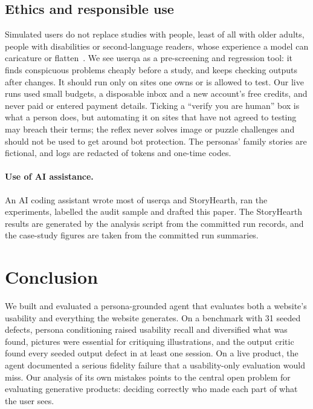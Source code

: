 \documentclass[10pt,twocolumn]{article}
\newcommand{\sys}{\textsf{userqa}}
\newcommand{\site}{StoryHearth}
\begin{document}
\subsection{Ethics and responsible use}

Simulated users do not replace studies with people, least of all with older adults, people with disabilities or second-language readers, whose experience a model can caricature or flatten~\cite{cheng2023compost,wang2025large,agnew2024illusion}. We see \sys{} as a pre-screening and regression tool: it finds conspicuous problems cheaply before a study, and keeps checking outputs after changes. It should run only on sites one owns or is allowed to test. Our live runs used small budgets, a disposable inbox and a new account's free credits, and never paid or entered payment details. Ticking a ``verify you are human'' box is what a person does, but automating it on sites that have not agreed to testing may breach their terms; the reflex never solves image or puzzle challenges and should not be used to get around bot protection. The personas' family stories are fictional, and logs are redacted of tokens and one-time codes.

\paragraph{Use of AI assistance.} An AI coding assistant wrote most of \sys{} and \site{}, ran the experiments, labelled the audit sample and drafted this paper. The \site{} results are generated by the analysis script from the committed run records, and the case-study figures are taken from the committed run summaries.

\section{Conclusion}
\label{sec:conclusion}

We built and evaluated a persona-grounded agent that evaluates both a website's usability and everything the website generates. On a benchmark with 31 seeded defects, persona conditioning raised usability recall and diversified what was found, pictures were essential for critiquing illustrations, and the output critic found every seeded output defect in at least one session. On a live product, the agent documented a serious fidelity failure that a usability-only evaluation would miss. Our analysis of its own mistakes points to the central open problem for evaluating generative products: deciding correctly who made each part of what the user sees.
\end{document}
